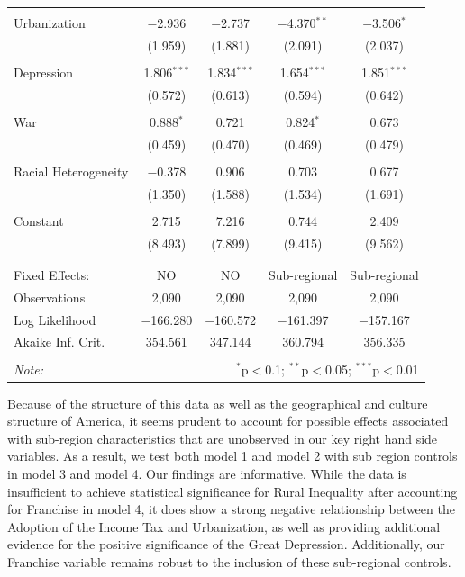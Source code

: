 \documentclass[letter, 12pt]{article}
\begin{document}
\begin{table}[!htbp]
\begin{tabular}{@{\extracolsep{5pt}}lcccc}
		& & & & \\ 
		Urbanization & $-$2.936 & $-$2.737 & $-$4.370$^{**}$ & $-$3.506$^{*}$ \\ 
		& (1.959) & (1.881) & (2.091) & (2.037) \\ 
		& & & & \\ 
		Depression & 1.806$^{***}$ & 1.834$^{***}$ & 1.654$^{***}$ & 1.851$^{***}$ \\ 
		& (0.572) & (0.613) & (0.594) & (0.642) \\ 
		& & & & \\ 
		War & 0.888$^{*}$ & 0.721 & 0.824$^{*}$ & 0.673 \\ 
		& (0.459) & (0.470) & (0.469) & (0.479) \\ 
		& & & & \\ 
		Racial Heterogeneity & $-$0.378 & 0.906 & 0.703 & 0.677 \\ 
		& (1.350) & (1.588) & (1.534) & (1.691) \\ 
		& & & & \\ 
		Constant & 2.715 & 7.216 & 0.744 & 2.409 \\ 
		& (8.493) & (7.899) & (9.415) & (9.562) \\ 
		& & & & \\ 
		\hline \\[-1.8ex] 
		Fixed Effects: & NO & NO & Sub-regional & Sub-regional \\ 
		Observations & 2,090 & 2,090 & 2,090 & 2,090 \\ 
		Log Likelihood & $-$166.280 & $-$160.572 & $-$161.397 & $-$157.167 \\ 
		Akaike Inf. Crit. & 354.561 & 347.144 & 360.794 & 356.335 \\ 
		\hline 
		\hline \\[-1.8ex] 
		\textit{Note:}  & \multicolumn{4}{r}{$^{*}$p$<$0.1; $^{**}$p$<$0.05; $^{***}$p$<$0.01} \\ 
	\end{tabular} 
\end{table} 

Because of the structure of this data as well as the geographical and culture structure of America, it seems prudent to account for possible effects associated with sub-region characteristics that are unobserved in our key right hand side variables. As a result, we test both model 1 and model 2 with sub region controls in model 3 and model 4. Our findings are informative. While the data is insufficient to achieve statistical significance for Rural Inequality after accounting for Franchise in model 4, it does show a strong negative relationship between the Adoption of the Income Tax and Urbanization, as well as providing additional evidence for the positive significance of the Great Depression. Additionally, our Franchise variable remains robust to the inclusion of these sub-regional controls.
\end{document}
